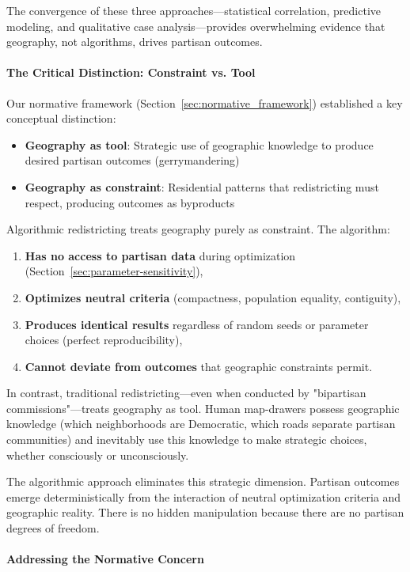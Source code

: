 The convergence of these three approaches---statistical correlation, predictive modeling, and qualitative case analysis---provides overwhelming evidence that geography, not algorithms, drives partisan outcomes.

\paragraph{The Critical Distinction: Constraint vs. Tool}

Our normative framework (Section~\ref{sec:normative_framework}) established a key conceptual distinction:
\begin{itemize}
\item \textbf{Geography as tool}: Strategic use of geographic knowledge to produce desired partisan outcomes (gerrymandering)
\item \textbf{Geography as constraint}: Residential patterns that redistricting must respect, producing outcomes as byproducts
\end{itemize}

Algorithmic redistricting treats geography purely as constraint. The algorithm:
\begin{enumerate}
\item \textbf{Has no access to partisan data} during optimization (Section~\ref{sec:parameter-sensitivity}),
\item \textbf{Optimizes neutral criteria} (compactness, population equality, contiguity),
\item \textbf{Produces identical results} regardless of random seeds or parameter choices (perfect reproducibility),
\item \textbf{Cannot deviate from outcomes} that geographic constraints permit.
\end{enumerate}

In contrast, traditional redistricting---even when conducted by "bipartisan commissions"---treats geography as tool. Human map-drawers possess geographic knowledge (which neighborhoods are Democratic, which roads separate partisan communities) and inevitably use this knowledge to make strategic choices, whether consciously or unconsciously.

The algorithmic approach eliminates this strategic dimension. Partisan outcomes emerge deterministically from the interaction of neutral optimization criteria and geographic reality. There is no hidden manipulation because there are no partisan degrees of freedom.

\paragraph{Addressing the Normative Concern}

